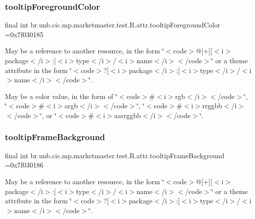 \subsubsection{\texorpdfstring{tooltip\+Foreground\+Color}{tooltipForegroundColor}}
{\footnotesize\ttfamily final int br.\+unb.\+cic.\+mp.\+marketmaster.\+test.\+R.\+attr.\+tooltip\+Foreground\+Color =0x7f030185\hspace{0.3cm}{\ttfamily [static]}}

May be a reference to another resource, in the form \char`\"{}$<$code$>$@\mbox{[}+\mbox{]}\mbox{[}$<$i$>$package$<$/i$>$\+:\mbox{]}$<$i$>$type$<$/i$>$/$<$i$>$name$<$/i$>$$<$/code$>$\char`\"{} or a theme attribute in the form \char`\"{}$<$code$>$?\mbox{[}$<$i$>$package$<$/i$>$\+:\mbox{]}$<$i$>$type$<$/i$>$/$<$i$>$name$<$/i$>$$<$/code$>$\char`\"{}. 

May be a color value, in the form of \char`\"{}$<$code$>$\#$<$i$>$rgb$<$/i$>$$<$/code$>$\char`\"{}, \char`\"{}$<$code$>$\#$<$i$>$argb$<$/i$>$$<$/code$>$\char`\"{}, \char`\"{}$<$code$>$\#$<$i$>$rrggbb$<$/i$>$$<$/code$>$\char`\"{}, or \char`\"{}$<$code$>$\#$<$i$>$aarrggbb$<$/i$>$$<$/code$>$\char`\"{}. \mbox{\label{classbr_1_1unb_1_1cic_1_1mp_1_1marketmaster_1_1test_1_1R_1_1attr_adafc1f4008ada87d4f8b5f8a1fdadf70}} 
\subsubsection{\texorpdfstring{tooltip\+Frame\+Background}{tooltipFrameBackground}}
{\footnotesize\ttfamily final int br.\+unb.\+cic.\+mp.\+marketmaster.\+test.\+R.\+attr.\+tooltip\+Frame\+Background =0x7f030186\hspace{0.3cm}{\ttfamily [static]}}

May be a reference to another resource, in the form \char`\"{}$<$code$>$@\mbox{[}+\mbox{]}\mbox{[}$<$i$>$package$<$/i$>$\+:\mbox{]}$<$i$>$type$<$/i$>$/$<$i$>$name$<$/i$>$$<$/code$>$\char`\"{} or a theme attribute in the form \char`\"{}$<$code$>$?\mbox{[}$<$i$>$package$<$/i$>$\+:\mbox{]}$<$i$>$type$<$/i$>$/$<$i$>$name$<$/i$>$$<$/code$>$\char`\"{}. \mbox{\label{classbr_1_1unb_1_1cic_1_1mp_1_1marketmaster_1_1test_1_1R_1_1attr_a76187630c805214185bc5122da0dd1e8}} 
